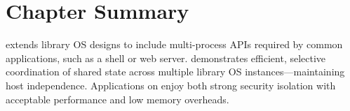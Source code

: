 \section{Chapter Summary}
\label{sec:graphene:summary}

\sysname{} extends library OS designs 
to include multi-process APIs required by common applications, such as a shell or 
web server.
\sysname{} demonstrates efficient, selective
coordination of shared state across multiple library OS 
instances---maintaining host independence.
Applications on \sysname{} enjoy both 
strong security isolation with acceptable performance and low memory overheads.




